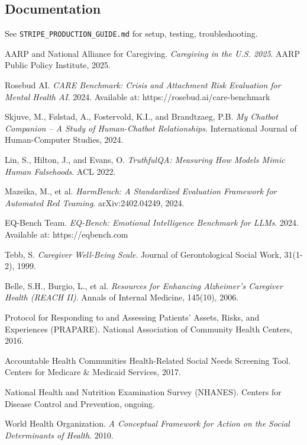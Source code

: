 \documentclass{article}
\begin{document}
\subsection*{Documentation}
See \texttt{STRIPE\_PRODUCTION\_GUIDE.md} for setup, testing, troubleshooting.
%
\begin{thebibliography}{99}

AARP and National Alliance for Caregiving.
\textit{Caregiving in the U.S. 2025}.
AARP Public Policy Institute, 2025.

Rosebud AI.
\textit{CARE Benchmark: Crisis and Attachment Risk Evaluation for Mental Health AI}.
2024. Available at: https://rosebud.ai/care-benchmark

Skjuve, M., Følstad, A., Fostervold, K.I., and Brandtzaeg, P.B.
\textit{My Chatbot Companion -- A Study of Human-Chatbot Relationships}.
International Journal of Human-Computer Studies, 2024.

Lin, S., Hilton, J., and Evans, O.
\textit{TruthfulQA: Measuring How Models Mimic Human Falsehoods}.
ACL 2022.

Mazeika, M., et al.
\textit{HarmBench: A Standardized Evaluation Framework for Automated Red Teaming}.
arXiv:2402.04249, 2024.

EQ-Bench Team.
\textit{EQ-Bench: Emotional Intelligence Benchmark for LLMs}.
2024. Available at: https://eqbench.com

Tebb, S.
\textit{Caregiver Well-Being Scale}.
Journal of Gerontological Social Work, 31(1-2), 1999.

Belle, S.H., Burgio, L., et al.
\textit{Resources for Enhancing Alzheimer's Caregiver Health (REACH II)}.
Annals of Internal Medicine, 145(10), 2006.

Protocol for Responding to and Assessing Patients' Assets, Risks, and Experiences (PRAPARE).
National Association of Community Health Centers, 2016.

Accountable Health Communities Health-Related Social Needs Screening Tool.
Centers for Medicare \& Medicaid Services, 2017.

National Health and Nutrition Examination Survey (NHANES).
Centers for Disease Control and Prevention, ongoing.

World Health Organization.
\textit{A Conceptual Framework for Action on the Social Determinants of Health}.
2010.


\end{thebibliography}
\end{document}
